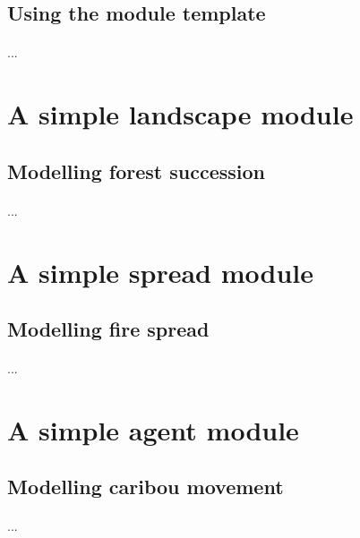 \documentclass{article}
\begin{document}
\subsection{Using the module template}

\paragraph{}
...

\newpage

\section{A simple landscape module}

\subsection{Modelling forest succession}

\paragraph{}
...

\newpage

\section{A simple spread module}

\subsection{Modelling fire spread}

\paragraph{}
...

\newpage

\section{A simple agent module}

\subsection{Modelling caribou movement}

\paragraph{}
...
\end{document}
